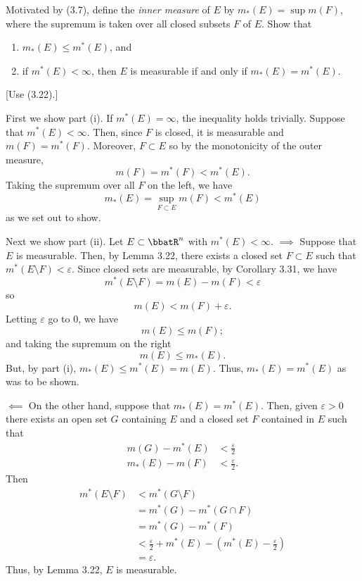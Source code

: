 \begin{problem}
  Motivated by (3.7), define the \emph{inner measure} of $E$ by
  $m_*(E)=\sup m(F)$, where the supremum is taken over all closed subsets
  $F$ of $E$. Show that
  \begin{enumerate}[label=(\roman*),noitemsep]
  \item $m_*(E)\leq m^*(E)$, and
  \item if $m^*(E)<\infty$, then $E$ is measurable if and only if
    $m_*(E)=m^*(E)$.
  \end{enumerate} [Use (3.22).]
\end{problem}
\begin{solution}
  First we show part (i). If $m^*(E)=\infty$, the inequality holds
  trivially. Suppose that $m^*(E)<\infty$. Then, since $F$ is closed, it is
  measurable and $m(F)=m^*(F)$. Moreover, $F\subset E$ so by the
  monotonicity of the outer measure,
  \[
    m(F)=m^*(F)<m^*(E).
  \]
  Taking the supremum over all $F$ on the left, we have
  \[
    m_*(E)=\sup_{F\subset E}m(F)<m^*(E)
  \]
  as we set out to show.

  Next we show part (ii). Let $E\subset\bbatR^n$ with
  $m^*(E)<\infty$. $\implies$ Suppose that $E$ is measurable. Then, by
  Lemma 3.22, there exists a closed set $F\subset E$ such that
  $m^*(E\setminus F)<\varepsilon$. Since closed sets are measurable,
  by Corollary 3.31, we have
  \[
    m^*(E\setminus F)=m(E)-m(F)<\varepsilon
  \]
  so
  \[
    m(E)<m(F)+\varepsilon.
  \]
  Letting $\varepsilon$ go to $0$, we have
  \[
    m(E)\leq m(F);
  \]
  and taking the supremum on the right
  \[
    m(E)\leq m_*(E).
  \]
  But, by part (i), $m_*(E)\leq m^*(E)=m(E)$. Thus, $m_*(E)=m^*(E)$ as was
  to be shown.

  $\impliedby$ On the other hand, suppose that $m_*(E)=m^*(E)$. Then, given
  $\varepsilon>0$ there exists an open set $G$ containing $E$ and a closed
  set $F$ contained in $E$ such that
  \begin{align*}
    m(G)-m^*(E)&<\frac{\varepsilon}{2}\\
    m_*(E)-m(F)&<\frac{\varepsilon}{2}.
  \end{align*}
  Then
  \begin{align*}
    m^*(E\setminus F)
    &<m^*(G\setminus F)\\
    &=m^*(G)-m^*(G\cap F)\\
    &=m^*(G)-m^*(F)\\
    &<\frac{\varepsilon}{2}+m^*(E)-\left(m^*(E)-\frac{\varepsilon}{2}\right)\\
    &=\varepsilon.
  \end{align*}
  Thus, by Lemma 3.22, $E$ is measurable.
\end{solution}

